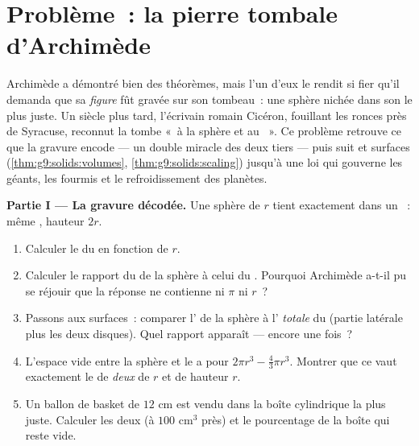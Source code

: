 \section{Problème~: la pierre tombale d'Archimède}

\begin{problem}
\label{pb:g9:solids:1}
Archimède a démontré bien des théorèmes, mais l'un d'eux le rendit si
fier qu'il demanda que sa \emph{figure} fût gravée sur son tombeau~:
une sphère nichée dans son  le plus juste. Un siècle plus
tard, l'écrivain romain Cicéron, fouillant les ronces près de
Syracuse, reconnut la tombe «~à la sphère et au ~». Ce
problème retrouve ce que la gravure encode --- un double miracle des
deux tiers --- puis suit  et surfaces
(\cref{thm:g9:solids:volumes}, \cref{thm:g9:solids:scaling}) jusqu'à
une loi qui gouverne les géants, les fourmis et le refroidissement
des planètes.

\medskip
\noindent\textbf{Partie I --- La gravure décodée.}
Une sphère de  $r$ tient exactement dans un ~: même
, hauteur $2r$.
\begin{enumerate}
  \item Calculer le  du  en fonction de $r$.
  \item Calculer le rapport du  de la sphère à celui du
        . Pourquoi Archimède a-t-il pu se réjouir que la
        réponse ne contienne ni $\pi$ ni $r$~?
  \item Passons aux surfaces~: comparer l' de la sphère à
        l' \emph{totale} du  (partie latérale plus les
        deux disques). Quel rapport apparaît --- encore une fois~?
  \item L'espace vide entre la sphère et le  a pour 
        $2\pi r^3 - \frac43\pi r^3$. Montrer que ce  vaut
        exactement le  de \emph{deux } de  $r$ et de
        hauteur $r$.
  \item Un ballon de basket de  $12$ cm est vendu dans la boîte
        cylindrique la plus juste. Calculer les deux  (à
        $100$ cm$^3$ près) et le pourcentage de la boîte qui reste
        vide.
\end{enumerate}


\end{problem}
